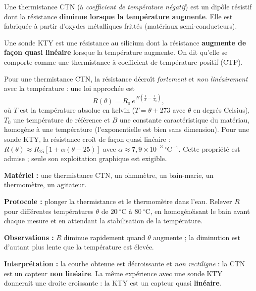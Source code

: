 \documentclass[11pt]{article}
\newcommand{\cle}[1]{{\popxbold\color{popdark}#1}}
\begin{document}
\begin{definition}
Une \cle{thermistance CTN} (à \emph{coefficient de température négatif}) est un dipôle résistif dont la résistance \textbf{diminue lorsque la température augmente}. Elle est fabriquée à partir d'oxydes métalliques frittés (matériaux semi-conducteurs).
\end{definition}

\begin{definition}
Une \cle{sonde KTY} est une résistance au silicium dont la résistance \textbf{augmente de façon quasi linéaire} lorsque la température augmente. On dit qu'elle se comporte comme une thermistance à coefficient de température positif (CTP).
\end{definition}

\begin{propriete}
Pour une thermistance CTN, la résistance décroît \emph{fortement} et \emph{non linéairement} avec la température : une loi approchée est
\[ R(\theta) = R_0 \, e^{\,B\left(\frac{1}{T} - \frac{1}{T_0}\right)}, \]
où $T$ est la température absolue en kelvin ($T = \theta + 273$ avec $\theta$ en degrés Celsius), $T_0$ une température de référence et $B$ une constante caractéristique du matériau, homogène à une température (l'exponentielle est bien sans dimension). Pour une sonde KTY, la résistance croît de façon quasi linéaire : $R(\theta) \approx R_{25}\left[1 + \alpha(\theta - 25)\right]$ avec $\alpha \approx 7{,}9 \times 10^{-3}~^{\circ}$C$^{-1}$. Cette propriété est admise ; seule son exploitation graphique est exigible.
\end{propriete}

\begin{experience}[Tracé de la caractéristique $R = f(\theta)$ d'une CTN]
\textbf{Matériel :} une thermistance CTN, un ohmmètre, un bain-marie, un thermomètre, un agitateur.

\textbf{Protocole :} plonger la thermistance et le thermomètre dans l'eau. Relever $R$ pour différentes températures $\theta$ de $20~^{\circ}$C à $80~^{\circ}$C, en homogénéisant le bain avant chaque mesure et en attendant la stabilisation de la température.

\textbf{Observations :} $R$ diminue rapidement quand $\theta$ augmente ; la diminution est d'autant plus lente que la température est élevée.

\textbf{Interprétation :} la courbe obtenue est décroissante et \emph{non rectiligne} : la CTN est un capteur \textbf{non linéaire}. La même expérience avec une sonde KTY donnerait une droite croissante : la KTY est un capteur quasi \textbf{linéaire}.
\end{experience}
\end{document}
